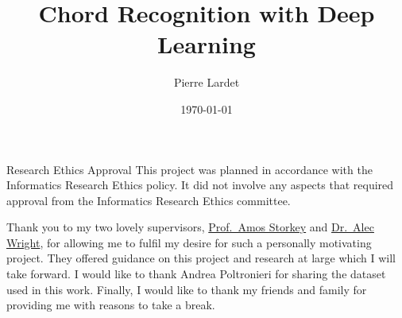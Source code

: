 \begin{preliminary}

    \title{Chord Recognition with Deep Learning}
    
    \author{Pierre Lardet}
    
    
    
    
    \date{\today}
    
    
    \maketitle
    
    \newenvironment{ethics}
       {\begin{frontenv}{Research Ethics Approval}{\LARGE}}
       {\end{frontenv}\newpage}
    
    \begin{ethics}
    This project was planned in accordance with the Informatics Research
    Ethics policy. It did not involve any aspects that required approval
    from the Informatics Research Ethics committee.
    
    \standarddeclaration
    \end{ethics}
    
    
    \begin{acknowledgements}
    Thank you to my two lovely supervisors, \hyperlink{https://homepages.inf.ed.ac.uk/amos/index.html}{Prof.~Amos Storkey} and \hyperlink{https://www.acoustics.ed.ac.uk/people/dr-alec-wright/}{Dr.~Alec Wright}, for allowing me to fulfil my desire for such a personally motivating project. They offered guidance on this project and research at large which I will take forward. I would like to thank Andrea Poltronieri for sharing the dataset used in this work. Finally, I would like to thank my friends and family for providing me with reasons to take a break.
    \end{acknowledgements}
    
    
    \tableofcontents
    \end{preliminary}